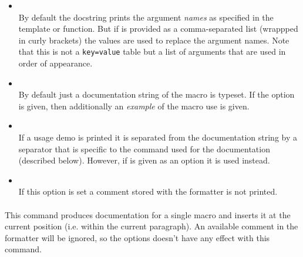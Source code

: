 \documentclass[12pt]{scrartcl}
\begin{document}
\begin{itemize}
\item {}\\
By default the docstring prints the argument \emph{names} as specified in the
template or function.  But if  is provided as a comma-separated
list (wrappped in curly brackets) the values are used to replace the argument
names.  Note that this is not a \texttt{key=value} table but a list of arguments
that are used in order of appearance.
\item {}\\
By default just a documentation string of the macro is typeset.  If the
 option is given, then additionally an \emph{example} of the macro
use is given.
\item {}\\
If a usage demo is printed it is separated from the documentation string by a
separator that is specific to the command used for the documentation (described
below).  However, if  is given as an option it is used instead.
\item {}\\
If this option is set a comment stored with the formatter is not printed.
\end{itemize}

\paragraph{\texttt{}}

This command produces documentation for a single macro and inserts it at the
current position (i.e. within the current paragraph).  An available comment in
the formatter will be ignored, so the  options doesn't have
any effect with this command.
\end{document}
